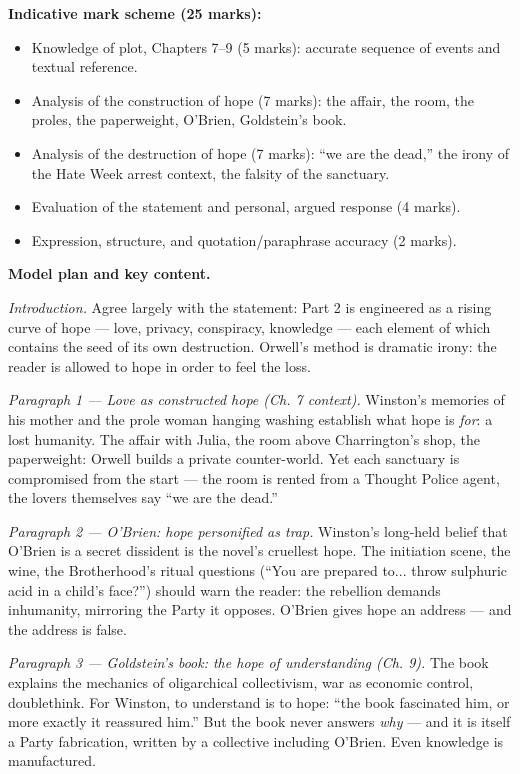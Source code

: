 \documentclass[11pt]{article}
\begin{document}
\begin{corrige}
\textbf{Indicative mark scheme (25 marks):}
\begin{itemize}
\item Knowledge of plot, Chapters 7--9 (5 marks): accurate sequence of events and textual reference.
\item Analysis of the construction of hope (7 marks): the affair, the room, the proles, the paperweight, O'Brien, Goldstein's book.
\item Analysis of the destruction of hope (7 marks): ``we are the dead,'' the irony of the Hate Week arrest context, the falsity of the sanctuary.
\item Evaluation of the statement and personal, argued response (4 marks).
\item Expression, structure, and quotation/paraphrase accuracy (2 marks).
\end{itemize}

\textbf{Model plan and key content.}

\emph{Introduction.} Agree largely with the statement: Part 2 is engineered as a rising curve of hope --- love, privacy, conspiracy, knowledge --- each element of which contains the seed of its own destruction. Orwell's method is dramatic irony: the reader is allowed to hope in order to feel the loss.

\emph{Paragraph 1 --- Love as constructed hope (Ch. 7 context).} Winston's memories of his mother and the prole woman hanging washing establish what hope is \emph{for}: a lost humanity. The affair with Julia, the room above Charrington's shop, the paperweight: Orwell builds a private counter-world. Yet each sanctuary is compromised from the start --- the room is rented from a Thought Police agent, the lovers themselves say ``we are the dead.''

\emph{Paragraph 2 --- O'Brien: hope personified as trap.} Winston's long-held belief that O'Brien is a secret dissident is the novel's cruellest hope. The initiation scene, the wine, the Brotherhood's ritual questions (``You are prepared to... throw sulphuric acid in a child's face?'') should warn the reader: the rebellion demands inhumanity, mirroring the Party it opposes. O'Brien gives hope an address --- and the address is false.

\emph{Paragraph 3 --- Goldstein's book: the hope of understanding (Ch. 9).} The book explains the mechanics of oligarchical collectivism, war as economic control, doublethink. For Winston, to understand is to hope: ``the book fascinated him, or more exactly it reassured him.'' But the book never answers \emph{why} --- and it is itself a Party fabrication, written by a collective including O'Brien. Even knowledge is manufactured.


\end{corrige}
\end{document}
